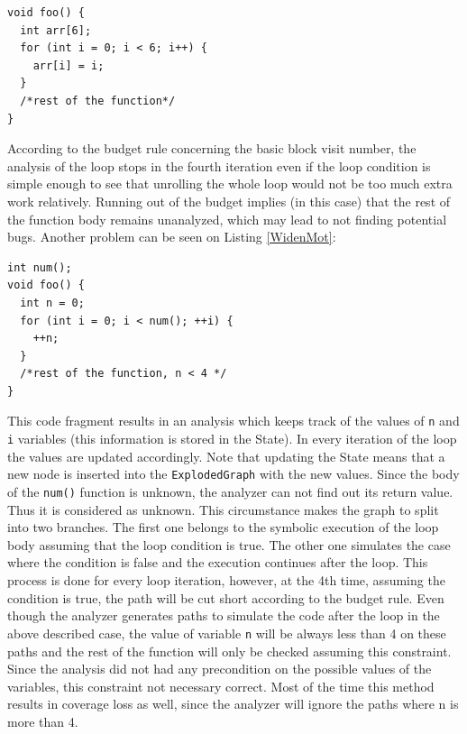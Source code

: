 \documentclass[oneside, a4paper, 12pt]{article}
\theoremstyle{definition}
\begin{document}
\begin{lstlisting}
void foo() {
  int arr[6];
  for (int i = 0; i < 6; i++) {
    arr[i] = i;
  }
  /*rest of the function*/
}\end{lstlisting}

According to the budget rule concerning the basic block visit number, the
analysis of the loop stops in the fourth iteration even if the loop 
condition is simple enough to see that unrolling the whole loop would not be 
too much extra work relatively. Running out of the budget implies (in this 
case) that the rest of the function body remains unanalyzed, which may lead to 
not finding potential bugs.
Another problem can be seen on Listing \ref{WidenMot}:
\begin{lstlisting}
int num();
void foo() {
  int n = 0;
  for (int i = 0; i < num(); ++i) {
    ++n;
  }
  /*rest of the function, n < 4 */
}\end{lstlisting}

This code fragment results in an analysis which keeps track of the values of 
\texttt{n} and \texttt{i} variables (this information is stored in the State). 
In every iteration of the loop the values are updated accordingly. Note that 
updating the
State means that a new node is inserted into the \texttt{ExplodedGraph} with the 
new 
values. Since the body of the \texttt{num()} function is unknown, the 
analyzer can not find out its return value. Thus it is considered as 
unknown. This circumstance
makes the graph to split into two branches. The first one belongs to the symbolic
execution of the loop body assuming that the loop condition is true. The 
other one simulates the case where the condition is false and the execution 
continues after the loop. This process is done for every loop iteration, 
however, at the 4th time, assuming the condition is true, the path will be cut 
short according to the budget rule.
Even though the analyzer generates paths to simulate the code after the loop 
in the above described case, the value of variable \texttt{n} will be 
always less than 4 on these paths and the rest of the function will only be 
checked assuming this constraint. Since the analysis did not had any 
precondition on the possible values of the variables, this constraint not 
necessary correct. Most of the time this method results in coverage loss as 
well, since the analyzer will ignore the paths where n is more than 4.
\end{document}
